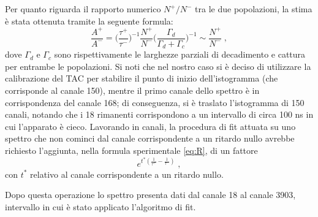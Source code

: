 \documentclass[10pt, oneside, a4paper]{article}   	%
\begin{document}
Per quanto riguarda il rapporto numerico $N^+/N^-$ tra le due popolazioni, la stima è stata ottenuta tramite la seguente formula: 
\begin{equation}
\frac{A^+}{A^-}= \bigg ( \frac{\tau^+}{\tau^-} \bigg )  ^{-1} \frac{N^+}{N^-} \bigg ( \frac{\Gamma_d}{\Gamma_d+\Gamma_c} \bigg )^{-1}\sim\frac{N^+}{N^-}\;,
\label{eq:R}%
\end{equation}
dove $\Gamma_d$ e $\Gamma_c$ sono rispettivamente le larghezze parziali di decadimento e cattura per entrambe le popolazioni. 
Si noti che nel nostro caso si è deciso di utilizzare la calibrazione del TAC per stabilire il punto di inizio dell'istogramma (che corrisponde al canale 150), mentre il primo canale dello spettro è in corrispondenza del canale 168; di conseguenza, si è traslato l'istogramma di 150 canali, notando che i 18  rimanenti corrispondono a un intervallo di circa 100 ns in cui l'apparato è cieco.
Lavorando in canali, la procedura di fit attuata su uno spettro che non cominci dal canale corrispondente a un ritardo nullo avrebbe richiesto l'aggiunta, nella formula sperimentale \ref{eq:R}, di un fattore
\[e^{t^*\left(\frac{1}{\tau^+}-\frac{1}{\tau^-}\right)}\;,\]
con $t^*$ relativo  al canale corrispondente a un ritardo nullo.

Dopo questa operazione lo spettro presenta dati dal canale 18 al canale 3903, intervallo in cui è stato applicato l'algoritmo di fit. 
\end{document}

